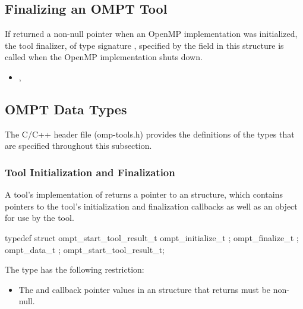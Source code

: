 \subsection{Finalizing an OMPT Tool}
\label{sec:ompt-finalization}

If  returned a non-null pointer when an OpenMP implementation 
was initialized, the tool finalizer, of type signature , 
specified by the  field in this structure is called when the OpenMP
implementation shuts down.

\crossreferences
\begin{itemize}
\item {}, 
\end{itemize}



\subsection{OMPT Data Types}
\label{sec:ompt-data-types}

The C/C++ header file (omp-tools.h) provides the definitions of the 
types that are specified throughout this subsection.

\subsubsection{Tool Initialization and Finalization}
\label{sec:ompt_start_tool_result_t}

\summary
A tool's implementation of  returns a pointer to an
 structure, which contains pointers to the tool's
initialization and finalization callbacks as well as an  
object for use by the tool.

\format
\begin{ccppspecific}
\begin{omptOther}
typedef struct ompt_start_tool_result_t {
  ompt_initialize_t ;
  ompt_finalize_t ;
  ompt_data_t ;
} ompt_start_tool_result_t;
\end{omptOther}
\end{ccppspecific}

\restrictions
The  type has the following restriction:

\begin{itemize}
\item The  and  callback pointer values in an
       structure that  
      returns must be non-null.
\end{itemize}

